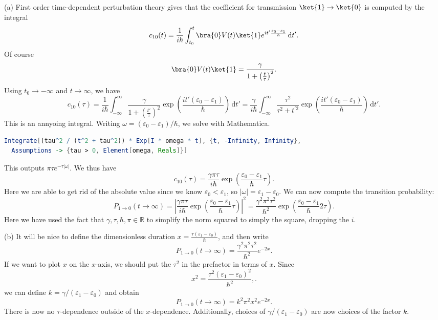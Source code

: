 \documentclass[11pt, letterpaper]{article}
\theoremstyle{plain}
\begin{document}
(a) First order time-dependent perturbation theory gives that the coefficient for transmission $\ket{1}\to \ket{0}$ is computed by the integral
\[
	c_{10} (t)=\frac{1}{i\hbar} \int_{t_0}^{t} \bra{0}V(t)\ket{1}e^{it'\frac{\varepsilon _0-\varepsilon _1}{\hbar} }  \,\mathrm{d} t'
.\]
Of course
\[
	\bra{0}V(t)\ket{1}=\frac{\gamma }{1+\left( \frac{t}{\tau }  \right) ^2} 
.\]
Using $t_0\to -\infty $ and $t\to \infty$, we have
\[
	c_{10} (\tau )=\frac{1}{i\hbar} \int_{-\infty }^{\infty } \frac{\gamma }{1+\left( \frac{t'}{\tau }  \right) ^2} \exp \left( \frac{it'(\varepsilon _0-\varepsilon _1)}{\hbar}  \right)  \,\mathrm{d} t'=\frac{\gamma }{i\hbar} \int_{-\infty }^{\infty } \frac{\tau ^2}{\tau ^2+t^{\prime 2} } \exp \left( \frac{it'(\varepsilon _0-\varepsilon _1)}{\hbar}  \right)  \,\mathrm{d} t'
.\]
This is an annyoing integral. Writing $\omega =(\varepsilon _0-\varepsilon _1)/\hbar$, we solve with Mathematica.
\begin{lstlisting}[language=Mathematica]
Integrate[(tau^2 / (t^2 + tau^2)) * Exp[I * omega * t], {t, -Infinity, Infinity},
  Assumptions -> {tau > 0, Element[omega, Reals]}]
\end{lstlisting}
This outputs $\pi \tau e^{-\tau \left| \omega  \right| } $. We thus have
\[
	c_{10} (\tau )=\frac{\gamma \pi \tau }{i\hbar} \exp \left( \frac{\varepsilon _0-\varepsilon _1}{\hbar} \tau  \right) 
.\]
Here we are able to get rid of the absolute value since we know $\varepsilon _0<\varepsilon _1$, so $\left| \omega  \right| =\varepsilon _1-\varepsilon _0$. We can now compute the transition probability:
\[
	P_{1\to 0} (t\to \infty )=\left| \frac{\gamma \pi \tau }{i\hbar} \exp \left( \frac{\varepsilon _0-\varepsilon _1}{\hbar} \tau  \right)  \right| ^2=\frac{\gamma ^2\pi ^2\tau ^2}{\hbar^2} \exp \left( \frac{\varepsilon _0-\varepsilon _1}{\hbar} 2\tau  \right) 
.\]
Here we have used the fact that $\gamma ,\tau ,\hbar,\pi \in\mathbb{R} $ to simplify the norm squared to simply the square, dropping the $i$.

(b) It will be nice to define the dimensionless duration $x=\frac{\tau (\varepsilon _1-\varepsilon _0)}{\hbar} $, and then write
\[
	P_{1\to 0} (t\to \infty )=\frac{\gamma ^2\pi ^2\tau ^2}{\hbar^2} e^{-2x} 
.\]
If we want to plot $x$ on the $x$-axis, we should put the $\tau ^2$ in the prefactor in terms of $x$. Since
\[
	x^2=\frac{\tau ^2\left( \varepsilon _1-\varepsilon _0 \right) ^2}{\hbar^2} ,
.\]
we can define $k=\gamma/(\varepsilon _1-\varepsilon _0)$ and obtain
\[
	P_{1\to 0} (t\to \infty )=k^2\pi ^2x^2e^{-2x} 
.\]
There is now no $\tau $-dependence outside of the $x$-dependence. Additionally, choices of $\gamma /(\varepsilon _1-\varepsilon _0)$ are now choices of the factor $k$.
\end{document}

